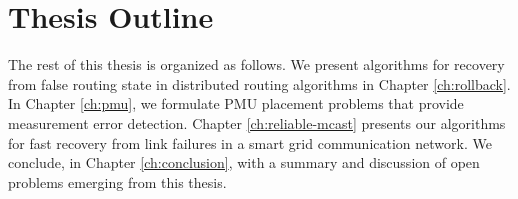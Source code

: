 \section{Thesis Outline}

The rest of this thesis is organized as follows.  We present algorithms for recovery from false routing state in distributed routing algorithms in Chapter \ref{ch:rollback}.  
In Chapter \ref{ch:pmu}, we formulate PMU placement problems that provide measurement error detection.  Chapter \ref{ch:reliable-mcast} presents our algorithms for fast recovery 
from link failures in a smart grid communication network.  We conclude, in Chapter \ref{ch:conclusion}, with a summary and discussion of open problems emerging from this thesis.
